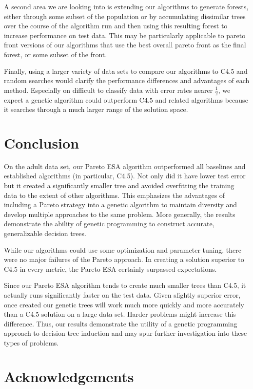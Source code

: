 \documentclass{acm_proc_article-sp}
\begin{document}
A second area we are looking into is extending our algorithms to generate forests, either through some subset of the population or by accumulating dissimilar trees over the course of the algorithm run and then using this resulting forest to increase performance on test data. This may be particularly applicable to pareto front versions of our algorithms that use the best overall pareto front as the final forest, or some subset of the front.

Finally, using a larger variety of data sets to compare our algorithms to C4.5 and random searches would clarify the performance differences and advantages of each method. Especially on difficult to classify data with error rates nearer $\frac{1}{2}$, we expect a genetic algorithm could outperform C4.5 and related algorithms because it searches through a much larger range of the solution space.

\section{Conclusion}

On the adult data set, our Pareto ESA algorithm outperformed all baselines and established algorithms (in particular, C4.5). Not only did it have lower test error but it created a significantly smaller tree and avoided overfitting the training data to the extent of other algorithms. This emphasizes the advantages of including a Pareto strategy into a genetic algorithm to maintain diversity and develop multiple approaches to the same problem. More generally, the results demonstrate the ability of genetic programming to construct accurate, generalizable decision trees.

While our algorithms could use some optimization and parameter tuning, there were no major failures of the Pareto approach. In creating a solution superior to C4.5 in every metric, the Pareto ESA certainly surpassed expectations.

Since our Pareto ESA algorithm tends to create much smaller trees than C4.5, it actually runs significantly faster on the test data. Given slightly superior error, once created our genetic trees will work much more quickly and more accurately than a C4.5 solution on a large data set. Harder problems might increase this difference. Thus, our results demonstrate the utility of a genetic programming approach to decision tree induction and may spur further investigation into these types of problems.

\section{Acknowledgements}
\end{document}
